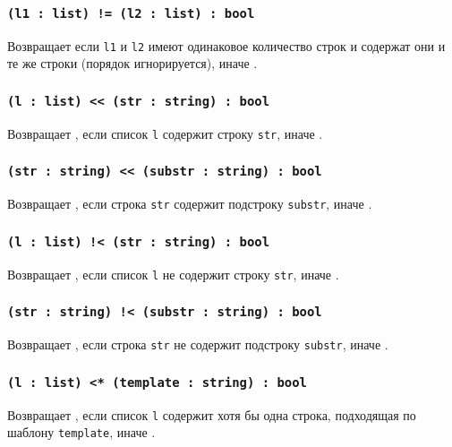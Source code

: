 \subsubsection{\texttt{(l1 : list) != (l2 : list) : bool}}

Возвращает \false{} если \texttt{l1} и \texttt{l2} имеют одинаковое количество строк и содержат они и те же строки (порядок игнорируется), иначе \true{}.

\subsubsection{\texttt{(l : list) << (str : string) : bool}}

Возвращает \true{}, если список \texttt{l} содержит строку \texttt{str}, иначе \false{}.

\subsubsection{\texttt{(str : string) << (substr : string) : bool}}

Возвращает \true{}, если строка \texttt{str} содержит подстроку \texttt{substr}, иначе \false{}.

\subsubsection{\texttt{(l : list) !< (str : string) : bool}}

Возвращает \true{}, если список \texttt{l} не содержит строку \texttt{str}, иначе \false{}.

\subsubsection{\texttt{(str : string) !< (substr : string) : bool}}

Возвращает \true{}, если строка \texttt{str} не содержит подстроку \texttt{substr}, иначе \false{}.

\subsubsection{\texttt{(l : list) <* (template : string) : bool}}

Возвращает \true{}, если список \texttt{l} содержит хотя бы одна строка, подходящая по шаблону \texttt{template}, иначе \false{}.

